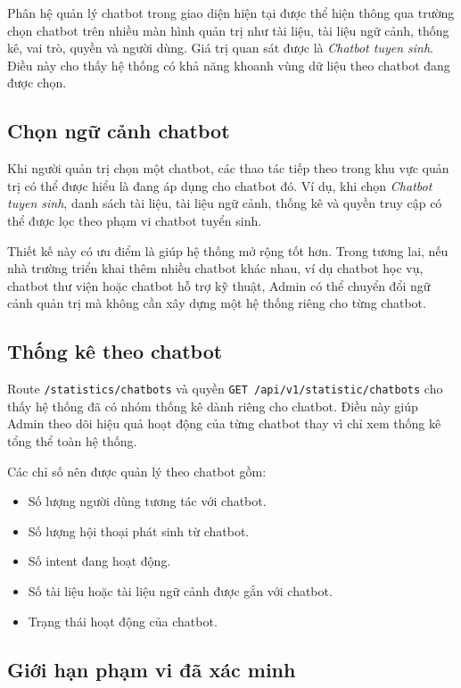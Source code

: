 \documentclass[12pt,a4paper]{report}
\begin{document}
Phân hệ quản lý chatbot trong giao diện hiện tại được thể hiện thông qua trường chọn chatbot trên nhiều màn hình quản trị như tài liệu, tài liệu ngữ cảnh, thống kê, vai trò, quyền và người dùng. Giá trị quan sát được là \textit{Chatbot tuyen sinh}. Điều này cho thấy hệ thống có khả năng khoanh vùng dữ liệu theo chatbot đang được chọn.

\subsection{Chọn ngữ cảnh chatbot}

Khi người quản trị chọn một chatbot, các thao tác tiếp theo trong khu vực quản trị có thể được hiểu là đang áp dụng cho chatbot đó. Ví dụ, khi chọn \textit{Chatbot tuyen sinh}, danh sách tài liệu, tài liệu ngữ cảnh, thống kê và quyền truy cập có thể được lọc theo phạm vi chatbot tuyển sinh.

Thiết kế này có ưu điểm là giúp hệ thống mở rộng tốt hơn. Trong tương lai, nếu nhà trường triển khai thêm nhiều chatbot khác nhau, ví dụ chatbot học vụ, chatbot thư viện hoặc chatbot hỗ trợ kỹ thuật, Admin có thể chuyển đổi ngữ cảnh quản trị mà không cần xây dựng một hệ thống riêng cho từng chatbot.

\subsection{Thống kê theo chatbot}

Route \texttt{/statistics/chatbots} và quyền \texttt{GET /api/v1/statistic/chatbots} cho thấy hệ thống đã có nhóm thống kê dành riêng cho chatbot. Điều này giúp Admin theo dõi hiệu quả hoạt động của từng chatbot thay vì chỉ xem thống kê tổng thể toàn hệ thống.

Các chỉ số nên được quản lý theo chatbot gồm:

\begin{itemize}
    \item Số lượng người dùng tương tác với chatbot.
    \item Số lượng hội thoại phát sinh từ chatbot.
    \item Số intent đang hoạt động.
    \item Số tài liệu hoặc tài liệu ngữ cảnh được gắn với chatbot.
    \item Trạng thái hoạt động của chatbot.
\end{itemize}

\subsection{Giới hạn phạm vi đã xác minh}
\end{document}
